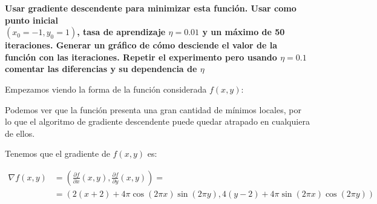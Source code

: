 \documentclass[a4]{article}
\begin{document}
\textbf{Usar gradiente descendente para minimizar esta función. Usar como punto inicial \\ $(x_0=-1,y_0=1)$, tasa de aprendizaje $\eta = 0.01$ y un máximo de 50 iteraciones.
Generar un gráfico de cómo desciende el valor de la función con las iteraciones. Repetir el experimento pero usando $\eta = 0.1$ comentar las diferencias y su dependencia de $\eta$}

Empezamos viendo la forma de la función considerada $f(x,y)$:
\begin{figure}[H]
	\centering    
	\caption{}
	\label{fig:f(x,y)}
\end{figure}

Podemos ver que la función presenta una gran cantidad de mínimos locales, por lo que el algoritmo de gradiente descendente puede quedar atrapado en cualquiera de ellos.

Tenemos que el gradiente de $f(x,y)$ es:

\begin{align*}
\nabla f(x,y) & = (\frac{\partial f}{\partial x}(x,y),\frac{\partial f}{\partial y}(x,y))=\\
& = (2(x+2)+4\pi\cos(2\pi x)\sin(2\pi y),4(y-2)+4\pi\sin(2\pi x)\cos(2\pi y))
\end{align*}
\end{document}
